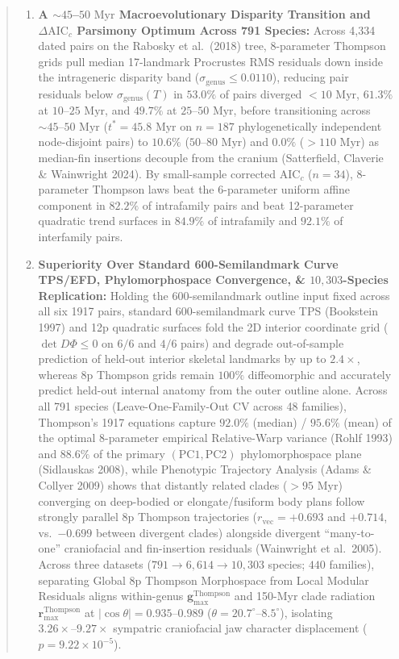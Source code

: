 \documentclass[11pt,a4paper]{article}
\theoremstyle{definition}
\theoremstyle{remark}
\newcommand{\AICc}{\mathrm{AIC}_c}
\begin{document}
\begin{abstract}
\begin{enumerate}
  \item \textbf{A $\sim 45$--$50\text{ Myr}$ Macroevolutionary Disparity Transition and $\Delta\AICc$ Parsimony Optimum Across 791 Species:} Across 4,334 dated pairs on the Rabosky et al.\ (2018) tree, 8-parameter Thompson grids pull median 17-landmark Procrustes RMS residuals down inside the intrageneric disparity band ($\sigma_{\text{genus}} \le 0.0110$), reducing pair residuals below $\sigma_{\text{genus}}(T)$ in $\mathbf{53.0\%}$ of pairs diverged $<10\text{ Myr}$, $\mathbf{61.3\%}$ at $10$--$25\text{ Myr}$, and $\mathbf{49.7\%}$ at $25$--$50\text{ Myr}$, before transitioning across $\sim 45$--$50\text{ Myr}$ ($t^* = 45.8\text{ Myr}$ on $n=187$ phylogenetically independent node-disjoint pairs) to $\mathbf{10.6\%}$ ($50$--$80\text{ Myr}$) and $\mathbf{0.0\%}$ ($>110\text{ Myr}$) as median-fin insertions decouple from the cranium (Satterfield, Claverie \& Wainwright 2024). By small-sample corrected $\AICc$ ($n = 34$), 8-parameter Thompson laws beat the 6-parameter uniform affine component in $\mathbf{82.2\%}$ of intrafamily pairs and beat 12-parameter quadratic trend surfaces in $\mathbf{84.9\%}$ of intrafamily and $\mathbf{92.1\%}$ of interfamily pairs.
  \item \textbf{Superiority Over Standard 600-Semilandmark Curve TPS/EFD, Phylomorphospace Convergence, \& $10{,}303$-Species Replication:} Holding the 600-semilandmark outline input fixed across all six 1917 pairs, standard 600-semilandmark curve TPS (Bookstein 1997) and 12p quadratic surfaces fold the 2D interior coordinate grid ($\det D\Phi \le 0$ on $6/6$ and $4/6$ pairs) and degrade out-of-sample prediction of held-out interior skeletal landmarks by up to $2.4\times$, whereas 8p Thompson grids remain $100\%$ diffeomorphic and accurately predict held-out internal anatomy from the outer outline alone. Across all 791 species (Leave-One-Family-Out CV across 48 families), Thompson's 1917 equations capture $\mathbf{92.0\%}$ (median) / $\mathbf{95.6\%}$ (mean) of the optimal 8-parameter empirical Relative-Warp variance (Rohlf 1993) and $\mathbf{88.6\%}$ of the primary $(\mathrm{PC1}, \mathrm{PC2})$ phylomorphospace plane (Sidlauskas 2008), while Phenotypic Trajectory Analysis (Adams \& Collyer 2009) shows that distantly related clades ($>95\text{ Myr}$) converging on deep-bodied or elongate/fusiform body plans follow strongly parallel 8p Thompson trajectories ($r_{\mathrm{vec}} = +0.693$ and $+0.714$, vs.\ $-0.699$ between divergent clades) alongside divergent ``many-to-one'' craniofacial and fin-insertion residuals (Wainwright et al.\ 2005). Across three datasets ($791 \to 6{,}614 \to 10{,}303$ species; $440$ families), separating Global 8p Thompson Morphospace from Local Modular Residuals aligns within-genus $\mathbf{g}_{\max}^{\mathrm{Thompson}}$ and 150-Myr clade radiation $\mathbf{r}_{\max}^{\mathrm{Thompson}}$ at $|\cos\theta| = 0.935\text{--}0.989$ ($\theta = 20.7^\circ\text{--}8.5^\circ$), isolating $3.26\times\text{--}9.27\times$ sympatric craniofacial jaw character displacement ($p = 9.22 \times 10^{-5}$).

\end{enumerate}
\end{abstract}
\end{document}

